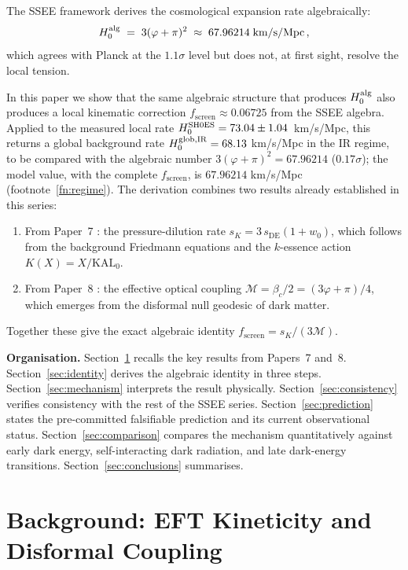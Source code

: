 \documentclass[12pt,a4paper]{article}
\newcommand{\phiG}{\varphi}
\newcommand{\KAL}{\mathrm{KAL}_0}
\newcommand{\MIRA}{\mathcal{M}}
\newcommand{\Hzero}{H_0}
\newcommand{\bc}{\beta_c}
\newcommand{\fsc}{f_{\mathrm{screen}}}
\newcommand{\sK}{s_K}          %
\newcommand{\sDE}{s_{\mathrm{DE}}} %
\begin{document}
The SSEE framework \citep{Paper1,Paper2,Paper3,Paper7} derives the
cosmological expansion rate algebraically:
\begin{equation}
  \Hzero^{\rm alg} \;=\; 3(\phiG+\pi)^2 \;\approx\; 67.96214\;\text{km/s/Mpc}\,,
  \label{eq:H0alg}
\end{equation}
which agrees with Planck at the $1.1\sigma$ level
\citep{Paper2} but does not, at first sight, resolve the local tension.

In this paper we show that the same algebraic structure that produces
$\Hzero^{\rm alg}$ also produces a local kinematic correction
$\fsc \approx 0.06725$ from the SSEE algebra. Applied to the measured
local rate $H_0^{\rm SH0ES} = 73.04\pm1.04$~km/s/Mpc, this returns a global
background rate $H_0^{\rm glob,IR} = 68.13$ km/s/Mpc in the IR regime, to be
compared with the algebraic number $3(\phiG+\pi)^2 = 67.96214$ ($0.17\sigma$);
the model value, with the complete $\fsc$, is $67.96214$ km/s/Mpc (footnote~\ref{fn:regime}).
The derivation combines two results already established in this series:
\begin{enumerate}
  \item From Paper~7 \citep{Paper7}: the pressure-dilution rate
        $\sK = 3\,\sDE(1+w_0)$, which follows from the background
        Friedmann equations and the $k$-essence action $K(X) = X/\KAL$.
  \item From Paper~8 \citep{Paper8}: the effective optical coupling
        $\MIRA = \bc/2 = (3\phiG+\pi)/4$, which emerges from the disformal
        null geodesic of dark matter.
\end{enumerate}
Together these give the exact algebraic identity $\fsc = \sK/(3\MIRA)$.

\bigskip

\noindent\textbf{Organisation.}
Section~\ref{sec:background} recalls the key results from Papers~7 and~8.
Section~\ref{sec:identity} derives the algebraic identity in three steps.
Section~\ref{sec:mechanism} interprets the result physically.
Section~\ref{sec:consistency} verifies consistency with the rest of the
SSEE series.
Section~\ref{sec:prediction} states the pre-committed falsifiable prediction
and its current observational status.
Section~\ref{sec:comparison} compares the mechanism quantitatively against
early dark energy, self-interacting dark radiation, and late dark-energy
transitions.
Section~\ref{sec:conclusions} summarises.

\section{Background: EFT Kineticity and Disformal Coupling}
\label{sec:background}
\end{document}
